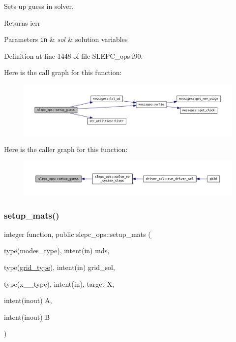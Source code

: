 Sets up guess in solver. 

\begin{DoxyReturn}{Returns}
ierr
\end{DoxyReturn}

\begin{DoxyParams}[1]{Parameters}
\mbox{\tt in}  & {\em sol} & solution variables \\
\hline
\end{DoxyParams}


Definition at line 1448 of file S\+L\+E\+P\+C\+\_\+ops.\+f90.

Here is the call graph for this function\+:\nopagebreak
\begin{figure}[H]
\begin{center}
\leavevmode
\includegraphics[width=350pt]{namespaceslepc__ops_a17a57b58ac6ca48ff4bdb44e8689bb19_cgraph}
\end{center}
\end{figure}
Here is the caller graph for this function\+:\nopagebreak
\begin{figure}[H]
\begin{center}
\leavevmode
\includegraphics[width=350pt]{namespaceslepc__ops_a17a57b58ac6ca48ff4bdb44e8689bb19_icgraph}
\end{center}
\end{figure}
\mbox{\label{namespaceslepc__ops_aac8202cb74cbb06013eb73f1fa0c3118}} 
\subsubsection{\texorpdfstring{setup\+\_\+mats()}{setup\_mats()}}
{\footnotesize\ttfamily integer function, public slepc\+\_\+ops\+::setup\+\_\+mats (\begin{DoxyParamCaption}\item[{type(modes\+\_\+type), intent(in)}]{mds,  }\item[{type(\hyperlink{structgrid__vars_1_1grid__type}{grid\+\_\+type}), intent(in)}]{grid\+\_\+sol,  }\item[{type(x\+\_\+2\+\_\+type), intent(in), target}]{X,  }\item[{intent(inout)}]{A,  }\item[{intent(inout)}]{B }\end{DoxyParamCaption})}



